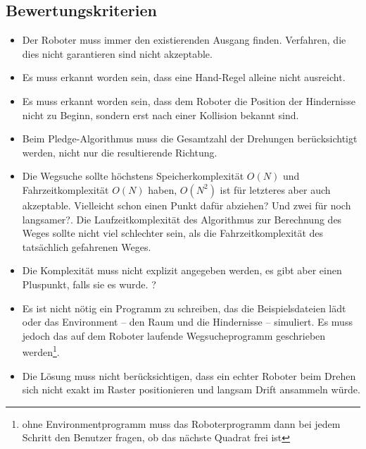 \documentclass[10pt,a4paper]{article}
\newcommand{\notsure}[1]{{\color{red} #1}}
\begin{document}
\subsection{Bewertungskriterien}
  
\begin{itemize}

\item Der Roboter muss immer den existierenden Ausgang finden. Verfahren, die dies nicht garantieren  sind nicht akzeptable.

\item Es muss erkannt worden sein, dass eine Hand-Regel alleine nicht ausreicht.

\item Es muss erkannt worden sein, dass dem Roboter die Position der Hindernisse nicht zu Beginn, sondern erst nach einer Kollision bekannt sind.

\item Beim Pledge-Algorithmus muss die Gesamtzahl der Drehungen berücksichtigt werden, nicht nur die resultierende Richtung.

\item Die Wegsuche sollte höchstens Speicherkomplexität $O(N)$ und  Fahrzeitkomplexität $O(N)$ haben, $O(N^2)$ ist für letzteres aber auch akzeptable. \notsure{Vielleicht schon einen Punkt dafür abziehen? Und zwei für noch langsamer?}. Die Laufzeitkomplexität des Algorithmus zur Berechnung des Weges  sollte nicht viel schlechter sein, als die Fahrzeitkomplexität des tatsächlich gefahrenen Weges.

\item Die Komplexität muss nicht explizit angegeben werden, es gibt aber einen Pluspunkt, falls sie es wurde. \notsure{?}

\item Es ist nicht nötig ein Programm zu schreiben, das die Beispielsdateien lädt oder das Environment -- den Raum und die Hindernisse -- simuliert. Es muss jedoch das auf dem Roboter laufende Wegsucheprogramm geschrieben werden\footnote{ohne Environmentprogramm muss das Roboterprogramm dann bei jedem Schritt den Benutzer fragen, ob das nächste Quadrat frei ist}. %


\item Die Lösung muss nicht berücksichtigen, dass ein echter Roboter beim Drehen sich nicht exakt im Raster positionieren und langsam Drift ansammeln würde.

\end{itemize}
\end{document}
